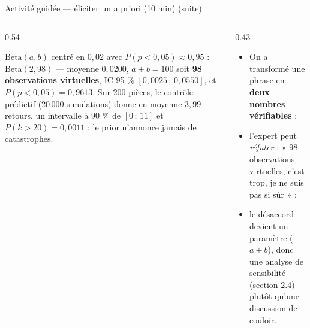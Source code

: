 \begin{frame}{Activité guidée — éliciter un a priori (10 min) (suite)}
\begin{columns}[t]
\begin{column}{0.54\textwidth}
\begin{solbox}
$\mathrm{Beta}(a,b)$ centré en $0{,}02$ avec $P(p < 0{,}05) \approx 0{,}95$ :
Beta$(2, 98)$ — moyenne $0{,}0200$, $a+b = 100$ soit
\textbf{98 observations virtuelles}, IC 95 \% $[0{,}0025 \,;\, 0{,}0550]$,
et $P(p < 0{,}05) = 0{,}9613$.
Sur $200$ pièces, le contrôle prédictif (20\,000 simulations) donne en moyenne
$3{,}99$ retours, un intervalle à $90$ \% de $[0 \,;\, 11]$ et
$P(k > 20) = 0{,}0011$ : le prior n'annonce jamais de catastrophes.
\end{solbox}
\end{column}
\begin{column}{0.43\textwidth}
\begin{ebox}
\begin{itemize}
  \item On a transformé une phrase en \textbf{deux nombres vérifiables} ;
  \item l'expert peut \emph{réfuter} : « 98 observations virtuelles, c'est
        trop, je ne suis pas si sûr » ;
  \item le désaccord devient un paramètre ($a+b$), donc une analyse de sensibilité
        (section 2.4) plutôt qu'une discussion de couloir.
\end{itemize}
\end{ebox}
\end{column}
\end{columns}
\end{frame}

